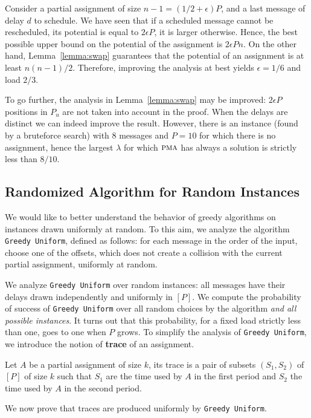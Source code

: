 \documentclass[a4paper,UKenglish,cleveref, autoref, thm-restate]{lipics-v2019}
\newcommand\pma{\textsc{pma}\xspace}
\newcommand\greedyuniform{\texttt{Greedy Uniform}\xspace}
\begin{document}
Consider a partial assignment of size $n-1 = (1/2 + \epsilon)P$, and a last message of delay $d$ to schedule.
We have seen that if a scheduled message cannot be rescheduled, its potential is equal to $2\epsilon P$, it is larger otherwise.
Hence, the best possible upper bound on the potential of the assignment is $2\epsilon P n$. On the other hand, Lemma~\ref{lemma:swap} guarantees that the potential of an assignment is at least $n(n-1)/2$. Therefore, improving the analysis at best yields $\epsilon = 1/6$ and 
load $2/3$.

To go further, the analysis in Lemma~\ref{lemma:swap} may be improved: $2\epsilon P$ positions in $P_{u}$ are not taken into account in the proof. When the delays are distinct we can indeed improve the result. However, there is an instance (found by a bruteforce search) with $8$ messages and $P=10$ for which there is no assignment, hence the largest $\lambda$ for which $\pma$ has always a solution is strictly less than $8/10$. 

\subsection{Randomized Algorithm for Random Instances}

We would like to better understand the behavior of greedy algorithms on instances drawn uniformly at random. To this aim, we analyze the algorithm \greedyuniform, defined as follows: for each message in the order of the input, choose one of the offsets, which does not create a collision with the current partial assignment, uniformly at random. 

We analyze \greedyuniform over random instances:  all messages have their delays drawn independently and uniformly in $[P]$. We compute the probability of success of \greedyuniform over all random choices by the algorithm \emph{and all possible instances}. 
It turns out that this probability, for a fixed load strictly less than one, goes to one when $P$ grows. To simplify the analysis of \greedyuniform, we introduce the notion of \textbf{trace} of an assignment. 

\begin{definition}
Let $A$ be a partial assignment of size $k$, its trace is a pair of subsets $(S_1,S_2)$ of $[P]$ of size $k$ such that $S_1$ are the time used by $A$ in the first period and $S_2$ the time used by $A$ in the second period.
\end{definition}

 We now prove that traces are produced uniformly by \greedyuniform.
\end{document}
